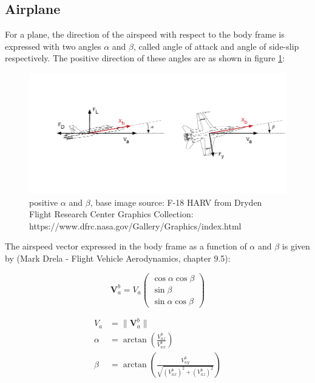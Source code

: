 \documentclass[a4paper]{paper}
\begin{document}
\subsection{Airplane}

For a plane, the direction of the airspeed with respect to the body frame is expressed with two angles $\alpha$ and $\beta$, called angle of attack and angle of side-slip respectively.
The positive direction of these angles are as shown in figure \ref{fig:alpha_beta}:

\begin{figure}[h]
\centering
\includegraphics[width=\textwidth]{img/alpha_beta.pdf}
\caption{positive $\alpha$ and $\beta$, base image source: F-18 HARV from Dryden Flight Research Center Graphics Collection: https://www.dfrc.nasa.gov/Gallery/Graphics/index.html}
\label{fig:alpha_beta}
\end{figure}

The airspeed vector expressed in the body frame as a function of $\alpha$ and $\beta$ is given by (Mark Drela - Flight Vehicle Aerodynamics, chapter 9.5):

\begin{equation}
    \bm{V}_a^b = V_a  \left(\begin{matrix} \cos\alpha \cos\beta\\
    \sin{\beta}\\
    \sin\alpha \cos\beta\end{matrix}\right)
\end{equation}

\begin{equation}
\begin{split}
    V_a &= \lVert \bm{V}_a^b \lVert\\
    \alpha &= \arctan\left(\frac{V_a^b_z}{V_a^b_x}\right)\\
    \beta &= \arctan\left(\frac{V_a^b_y}{\sqrt{(V_a^b_x)^2 + (V_a^b_z)^2}}\right)
\end{split}
\end{equation}
\end{document}
